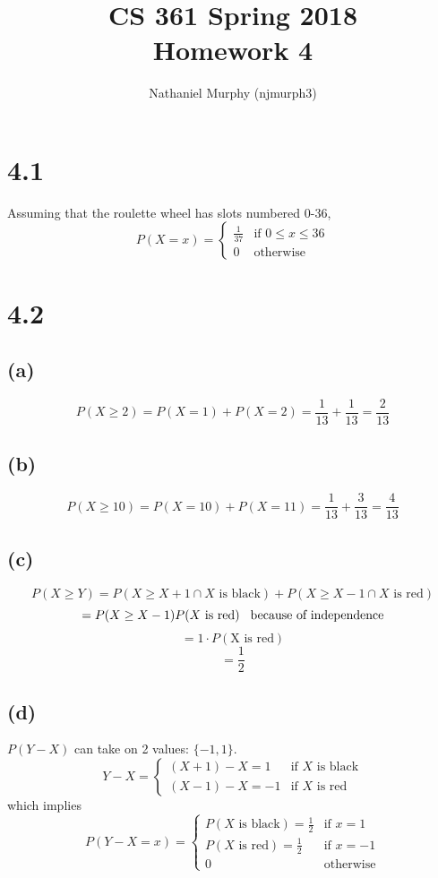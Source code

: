 \documentclass[11pt]{article}
\title{\textbf{CS 361 Spring 2018 \\ Homework 4}}
\author{Nathaniel Murphy (njmurph3)}
\begin{document}
\maketitle

\section*{4.1}
Assuming that the roulette wheel has slots numbered 0-36,
\[P(X=x)=\begin{cases}
	\frac{1}{37} & \text{if }0\leq x\leq 36 \\
	0 & \text{otherwise}
\end{cases}\]

\section*{4.2}
\subsection*{(a)}
\[P(X\geq2)=P(X=1)+P(X=2)=\frac{1}{13}+\frac{1}{13}=\frac{2}{13}\]
\subsection*{(b)}
\[P(X\geq10)=P(X=10)+P(X=11)=\frac{1}{13}+\frac{3}{13}=\frac{4}{13}\]
\subsection*{(c)}
\[P(X\geq Y)=P(X\geq X+1 \cap X\text{ is black})+P(X\geq X-1\cap X\text{ is red})\]
\[=P(X\geq X-1)P(X\text{ is red})\hspace{3mm}\text{because of independence}\]
\[=1\cdot P(\text{X is red})\]
\[=\frac{1}{2}\]
\subsection*{(d)}
$P(Y-X)$ can take on 2 values: $\{-1,1\}$.
\[Y-X=\begin{cases}
	(X+1)-X=1 & \text{if }X\text{ is black} \\
	(X-1)-X=-1 & \text{if }X\text{ is red}
\end{cases}\]
\clearpage
which implies
\[P(Y-X=x)=\begin{cases}
	P(X\text{ is black})=\frac{1}{2} & \text{if }x=1 \\
	P(X\text{ is red})=\frac{1}{2} & \text{if }x=-1 \\
	0 & \text{otherwise}
\end{cases}\]
\end{document}
